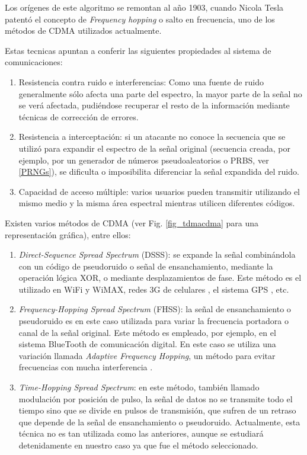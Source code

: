 Los orígenes de este algoritmo se remontan al año 1903, cuando Nicola Tesla patentó el concepto de \textit{Frequency hopping} o salto en frecuencia, uno de los métodos de CDMA utilizados actualmente.

Estas tecnicas apuntan a conferir las siguientes propiedades al sistema de comunicaciones:
\begin{enumerate} 
\item Resistencia contra ruido e interferencias: Como una fuente de ruido generalmente sólo afecta una parte del espectro, la mayor parte de la señal no se verá afectada, pudiéndose recuperar el resto de la información mediante técnicas de corrección de errores.
\item Resistencia a interceptación: si un atacante no conoce la secuencia que se utilizó para expandir el espectro de la señal original (secuencia creada, por ejemplo, por un generador de números pseudoaleatorios o PRBS, ver \ref{PRNGs}), se dificulta o imposibilita diferenciar la señal expandida del ruido.
\item Capacidad de acceso múltiple: varios usuarios pueden transmitir utilizando el mismo medio y la misma área espectral mientras utilicen diferentes códigos.
\end{enumerate} 

Existen varios métodos de CDMA (ver Fig. \ref{fig_tdmacdma} para una representación gráfica), entre ellos:
\begin{enumerate} 
\item \textit{Direct-Sequence Spread Spectrum} (DSSS): se expande la señal combinándola con un código de pseudoruido o señal de ensanchamiento, mediante la operación lógica XOR, o mediante desplazamientos de fase. Este método es el utilizado en WiFi y WiMAX, redes 3G de celulares \cite{dixon1994spread}, el sistema GPS \cite{kaplan2005understanding}, etc.
\item \textit{Frequency-Hopping Spread Spectrum} (FHSS): la señal de ensanchamiento o pseudoruido es en este caso utilizada para variar la frecuencia portadora o canal de la señal original. Este método es empleado, por ejemplo, en el sistema BlueTooth de comunicación digital. En este caso se utiliza una variación llamada \textit{Adaptive Frequency Hopping}, un método para evitar frecuencias con mucha interferencia \cite{golmie2003bluetooth}.
\item \textit{Time-Hopping Spread Spectrum}: en este método, también llamado modulación por posición de pulso, la señal de datos no se transmite todo el tiempo sino que se divide en pulsos de transmisión, que sufren de un retraso que depende de la señal de ensanchamiento o pseudoruido. Actualmente, esta técnica no es tan utilizada como las anteriores, aunque se estudiará detenidamente en nuestro caso ya que fue el método seleccionado.
\end{enumerate} 

